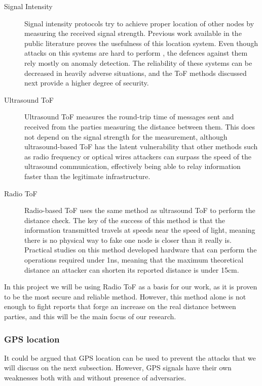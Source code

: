 \documentclass{article}
\begin{document}
\begin{description}
  \item[Signal Intensity] Signal intensity protocols try to achieve proper location of other nodes by measuring the received signal strength. Previous work available in the public literature\cite{seshadri2005bayesian} proves the usefulness of this location system. Even though attacks on this systems are hard to perform \cite{sheng2008detecting}, the defences against them rely mostly on anomaly detection. The reliability of these systems can be decreased in heavily adverse situations, and the ToF methods discussed next provide a higher degree of security.
  \item[Ultrasound ToF] Ultrasound ToF measures the round-trip time of messages sent and received from the parties measuring the distance between them. This does not depend on the signal strength for the measurement, although ultrasound-based ToF has the latent vulnerability that other methods such as radio frequency or optical wires attackers can surpass the speed of the ultrasound communication, effectively being able to relay information faster than the legitimate infrastructure\cite{capkun2006secure}.
  \item[Radio ToF] Radio-based ToF uses the same method as ultrasound ToF to perform the distance check. The key of the success of this method is that the information transmitted travels at speeds near the speed of light, meaning there is no physical way to fake one node is closer than it really is. Practical studies on this method \cite{rasmussen2010realization} developed hardware that can perform the operations required under 1ns, meaning that the maximum theoretical distance an attacker can shorten its reported distance is under 15cm.
\end{description}

In this project we will be using Radio ToF as a basis for our work, as it is proven to be the most secure and reliable method. However, this method alone is not enough to fight reports that forge an increase on the real distance between parties, and this will be the main focus of our research.

\subsubsection{GPS location}

It could be argued that GPS location can be used to prevent the attacks that we will discuss on the next subsection. However, GPS signals have their own weaknesses both with and without presence of adversaries.
\end{document}
